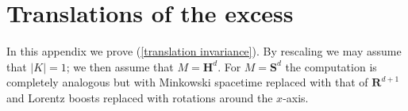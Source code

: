 \documentclass[reqno,10pt]{amsart}
\newcommand{\RR}{\mathbf{R}}
\newcommand{\Hyp}{\mathbf H}
\newcommand{\Sph}{\mathbf S}
\DeclareMathOperator{\id}{id}
\newcommand*\dif{\mathop{}\!\mathrm{d}}
\newtheorem{lemma}[theorem]{Lemma}
\theoremstyle{definition}
\numberwithin{equation}{section}
\begin{document}






\appendix 
\section{Translations of the excess} \label{translation appendix}
In this appendix we prove (\ref{translation invariance}).
By rescaling we may assume that $|K| = 1$; we then assume that $M = \Hyp^d$.
For $M = \Sph^d$ the computation is completely analogous but with Minkowski spacetime replaced with that of $\RR^{d + 1}$ and Lorentz boosts replaced with rotations around the $x$-axis.
\end{document}
